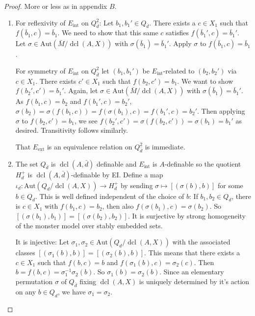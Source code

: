 \documentclass{amsart}
\theoremstyle{definition}
\theoremstyle{remark}
\numberwithin{equation}{section}
\def \aut {\text{Aut}}
\def \dcl {\operatorname{dcl}}
\begin{document}
\begin{proof}  More or less as in \cite{EhudHrushovski2002} appendix $B$.
    \begin{enumerate}
        \item For reflexivity of $E_{\text{int}}$ on $Q_{\bar{d}}^2$: Let $b_1,b_1' \in Q_{\bar{d}}$. There exists a $c \in X_1$ such that $f(\bar{b}_1,c) = \bar{b}_1$. We need to show that this same $c$ satisfies $f(\bar{b}_1',c) = \bar{b}_1'$. Let $\sigma \in \aut(\bar{M}/\dcl(A,X))$ with $\sigma(\bar{b}_1) = \bar{b}_1'$. Apply $\sigma$ to $f(\bar{b}_1,c) = \bar{b}_1$.
        
        For symmetry of $E_{\text{int}}$ on $Q_{\bar{d}}^2$ let $(b_1,b_1')$ be $E_{\text{int}}$-related to $(b_2,b_2')$ via $c \in X_1$. There exists $c' \in X_1$ such that $f(b_2,c') = b_1$. We want to show $f(b_2',c') = b_1'$. Again, let $\sigma \in \aut(\bar{M}/\dcl(A,X))$ with $\sigma(\bar{b}_1) = \bar{b}_1'$. As $f(b_1,c) = b_2$ and $f(b_1',c) = b_2'$, $\sigma(b_2) = \sigma(f(b_1,c)) = f(\sigma(b_1),c) = f(b_1',c) = b_2'$. Then applying $\sigma$ to $f(b_2,c') = b_1$, we see $f(b_2',c') = \sigma(f(b_2,c')) = \sigma(b_1) = b_1'$ as desired. Transitivity follows similarly. 
        
        That $E_{\text{ext}}$ is an equivalence relation on $Q_{\bar{d}}^2$ is immediate.

        \item The set $Q_{\bar{d}}$ is $\dcl(A,\bar{d})$ definable and $E_{\text{int}}$ is $A$-definable so the quotient $H^+_d$ is $\dcl(A,\bar{d})$-definable by EI. Define a map $\iota_{d}:\aut(Q_{d}/\dcl(A,X)) \to H^+_{d}$ by sending $\sigma \mapsto [(\sigma(b),b)]$ for some $b \in Q_{d}$. This is well defined independent of the choice of $b$: If $b_1,b_2 \in Q_{d}$, there is $c \in X_1$ with $f(b_1,c) = b_2$, then also $f(\sigma(b_1),c) = \sigma(b_2)$. So $[(\sigma(b_1),b_1)] = [(\sigma(b_2),b_2)]$. It is surjective by strong homogeneity of the monster model over stably embedded sets. 
        
        It is injective: Let $\sigma_1,\sigma_2 \in \aut(Q_{d}/\dcl(A,X))$ with the associated classes $[(\sigma_1(b),b)] = [(\sigma_2(b),b)]$. This means that there exists a $c \in X_1$ such that $f(b,c) = b$ and $f(\sigma_1(b),c) = \sigma_2(c)$. Then $b = f(b,c) = \sigma_1^{-1}\sigma_2(b)$. So $\sigma_1(b) = \sigma_2(b)$. Since an elementary permutation $\sigma$ of $Q_{\bar{d}}$ fixing $\dcl(A,X)$ is uniquely determined by it's action on any $b \in Q_{d}$, we have $\sigma_1 = \sigma_2$. 


\end{enumerate}
\end{proof}
\end{document}
